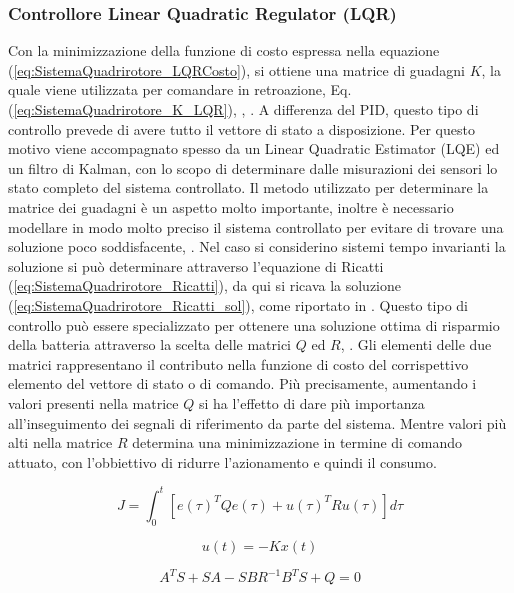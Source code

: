 \subsubsection{Controllore Linear Quadratic Regulator (LQR)}
Con la minimizzazione della funzione di costo espressa nella equazione (\ref{eq:SistemaQuadrirotore_LQRCosto}), si ottiene una matrice di guadagni $K$, la quale viene utilizzata per comandare in retroazione, Eq. (\ref{eq:SistemaQuadrirotore_K_LQR}), \cite{ParaskevopoulosP.N2002MCE}, \cite{6572698}. A differenza del PID, questo tipo di controllo prevede di avere tutto il vettore di stato a disposizione. Per questo motivo viene accompagnato spesso da un Linear Quadratic Estimator (LQE) ed un filtro di Kalman, con lo scopo di determinare dalle misurazioni dei sensori lo stato completo del sistema controllato. Il metodo utilizzato per determinare la matrice dei guadagni è un aspetto molto importante, inoltre è necessario modellare in modo molto preciso il sistema controllato per evitare di trovare una soluzione poco soddisfacente, \cite{ZuluAndrew2014ARoC}. Nel caso si considerino sistemi tempo invarianti la soluzione si può determinare attraverso l'equazione di Ricatti (\ref{eq:SistemaQuadrirotore_Ricatti}), da qui si ricava la soluzione (\ref{eq:SistemaQuadrirotore_Ricatti_sol}), come riportato in \cite{baseTesi}. Questo tipo di controllo può essere specializzato per ottenere una soluzione ottima di risparmio della batteria attraverso la scelta delle matrici $Q$ ed $R$, \cite{KoksalN2018ALQA}. Gli elementi delle due matrici rappresentano il contributo nella funzione di costo del corrispettivo elemento del vettore di stato o di comando. Più precisamente, aumentando i valori presenti nella matrice $Q$ si ha l'effetto di dare più importanza all'inseguimento dei segnali di riferimento da parte del sistema. Mentre valori più alti nella matrice $R$ determina una minimizzazione in termine di comando attuato, con l'obbiettivo di ridurre l'azionamento e quindi il consumo.

\begin{equation}\label{eq:SistemaQuadrirotore_LQRCosto}
	J = \int_{0}^{t} \left[e(\tau)^T Q e(\tau) + u(\tau)^T R u(\tau)\right] d \tau
\end{equation}

\begin{equation}\label{eq:SistemaQuadrirotore_K_LQR}
	u(t) = -K x(t)
\end{equation}

\begin{equation}\label{eq:SistemaQuadrirotore_Ricatti}
	A^T S + S A - S B R^{-1} B^T S + Q = 0
\end{equation}

